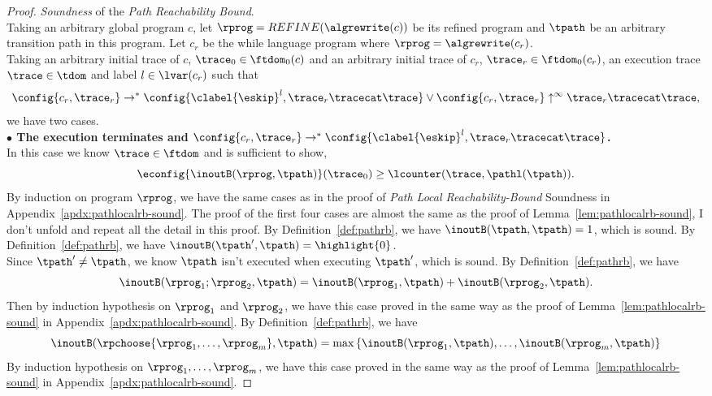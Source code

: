 \begin{proof}
\emph{Soundness} of the \emph{Path Reachability Bound}.
  \\
  Taking an arbitrary global program $c$, let $\rprog = REFINE(\algrewrite(c))$ be its refined program and $\tpath$ be an arbitrary transition path in this program.
  Let $c_r$ be the while language program where $\rprog = \algrewrite(c_r)$.
  \\
  Taking an arbitrary initial trace of $c$, $\trace_0 \in \ftdom_0(c)$ and an arbitrary initial trace of $c_r$, $\trace_r \in \ftdom_0(c_r)$, 
 an execution trace $\trace \in \tdom$ and label $l \in \lvar(c_r)$
 such that 
 \[
  \config{{c_r}, \trace_r} \to^{*} \config{\clabel{\eskip}^{l}, \trace_r \tracecat \trace} \lor \config{c_r, \trace_r} \uparrow^{\infty} \trace_r \tracecat \trace,
  \]
 we have two cases.
\\
\textbf{$\bullet$ The execution terminates and {$\config{{c_r}, \trace_r} \to^{*} \config{\clabel{\eskip}^{l}, \trace_r \tracecat \trace}$}.} 
\\
 In this case we know $\trace \in \ftdom$ and is sufficient to show,
 \[
 \econfig{\inoutB(\rprog, \tpath)}(\trace_0) \geq \lcounter(\trace, \pathl(\tpath)) .
 \]
By induction on program $\rprog$, we have the same cases as in the proof of \emph{Path Local Reachability-Bound} Soundness in Appendix~\ref{apdx:pathlocalrb-sound}.
The proof of the first four cases are almost the same as the proof of Lemma~\ref{lem:pathlocalrb-sound}, I don't unfold and repeat all the detail in this proof.
\caseL{$\rprog = \tpath$}
By Definition~\ref{def:pathrb}, we have $\inoutB(\tpath, \tpath) = 1$, which is sound.
By Definition~\ref{def:pathrb}, we have $\inoutB(\tpath', \tpath) = \highlight{0}$.
\\
Since $\tpath' \neq \tpath$, we know $\tpath$ isn't executed when executing $\tpath'$, which is sound.
By Definition~\ref{def:pathrb}, we have
\[
  \inoutB(\rprog_1;\rprog_2, \tpath) = \inoutB(\rprog_1, \tpath) + \inoutB(\rprog_2, \tpath). 
\]
Then by induction hypothesis on $\rprog_1$ and $\rprog_2$, we have this case proved in the same way as the proof of Lemma~\ref{lem:pathlocalrb-sound} in Appendix~\ref{apdx:pathlocalrb-sound}.
By Definition~\ref{def:pathrb}, we have 
\[
\inoutB(\rpchoose{\rprog_1, \ldots, \rprog_m }, \tpath) = 
\max\left\{ \inoutB(\rprog_1, \tpath), \ldots, \inoutB(\rprog_m, \tpath) \right\}
\] 
By induction hypothesis on $\rprog_1, \ldots, \rprog_m$, we have this case proved in the same way as the proof of Lemma~\ref{lem:pathlocalrb-sound} in Appendix~\ref{apdx:pathlocalrb-sound}.

\end{proof}
